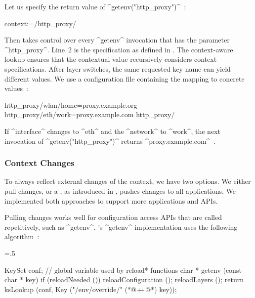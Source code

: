\begin{example}
Let us specify the return value of ^getenv("http_proxy")^~\cite{raab2017introducing}:

\begin{code}
  context:=/http_proxy/%
\end{code}

Then \elektra{} takes control over every ^getenv^ invocation that has the parameter ^http_proxy^.
Line~2 is the specification as defined in .
The context-aware lookup ensures that the contextual value recursively considers context specifications.
After layer switches, the same requested key name can yield different values.
We use a configuration file containing the mapping to concrete values~\cite{raab2017introducing}:

\begin{code}[language=CfgElektra]
http_proxy/wlan/home=proxy.example.org
http_proxy/eth/work=proxy.example.com
http_proxy/%
\end{code}

If ^interface^ changes to ^eth^ and the ^network^ to ^work^, the next invocation of ^getenv("http_proxy")^ returns ^proxy.example.com^~\cite{raab2017introducing}.
\end{example}

\subsubsection{Context Changes}
\label{sec:context-changes}

To always reflect external changes of the context, we have two options.
We either pull changes, or a , as introduced in , pushes changes to all applications.
We implemented both approaches to support more applications and APIs.

Pulling changes works well for configuration access APIs that are called repetitively, such as ^getenv^.
\elektra{}'s ^getenv^ implementation uses the following algorithm~\cite{raab2016unanticipated}:%
{\parfillskip=0pt \emergencystretch=.5\textwidth \par}

\begin{code}[language=Cpp,escapeinside={(*@}{@*)}]
KeySet conf; // global variable used by reload* functions
char * getenv (const char * key)
{
	if (reloadNeeded ())
	{
		reloadConfiguration ();
		reloadLayers ();
	}
	return ksLookup (conf, Key ("/env/override/" (*@$\operatorname*{\mathnormal{+\!\!+}}$@*) key));
}
\end{code}

